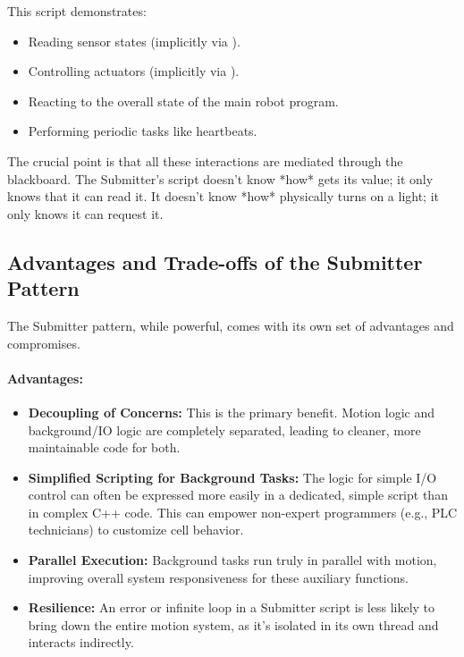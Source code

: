 This script demonstrates:
\begin{itemize}
    \item Reading sensor states (implicitly via ).
    \item Controlling actuators (implicitly via ).
    \item Reacting to the overall state of the main robot program.
    \item Performing periodic tasks like heartbeats.
\end{itemize}

The crucial point is that all these interactions are mediated through the  blackboard. The Submitter's script doesn't know *how*  gets its value; it only knows that it can read it. It doesn't know *how*  physically turns on a light; it only knows it can request it.

\subsection{Advantages and Trade-offs of the Submitter Pattern}
\label{subsec:submitter_tradeoffs}

The Submitter pattern, while powerful, comes with its own set of advantages and compromises.

\paragraph{Advantages:}
\begin{itemize}
    \item \textbf{Decoupling of Concerns:} This is the primary benefit. Motion logic and background/IO logic are completely separated, leading to cleaner, more maintainable code for both.
    \item \textbf{Simplified Scripting for Background Tasks:} The logic for simple I/O control can often be expressed more easily in a dedicated, simple script than in complex C++ code. This can empower non-expert programmers (e.g., PLC technicians) to customize cell behavior.
    \item \textbf{Parallel Execution:} Background tasks run truly in parallel with motion, improving overall system responsiveness for these auxiliary functions.
    \item \textbf{Resilience:} An error or infinite loop in a Submitter script is less likely to bring down the entire motion system, as it's isolated in its own thread and interacts indirectly.
\end{itemize}

